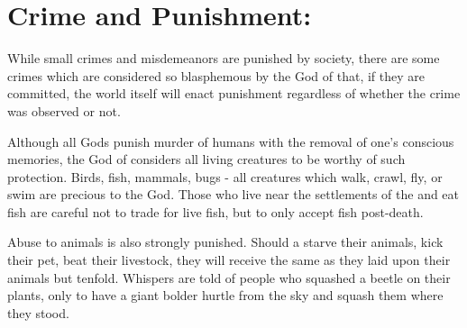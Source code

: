 \documentclass[blue]{GL2020}
\begin{document}
\section*{Crime and Punishment:}

While small crimes and misdemeanors are punished by society, there are some crimes which are considered so blasphemous by the God of \pFarm{} that, if they are committed, the world itself will enact punishment regardless of whether the crime was observed or not.

Although all Gods punish murder of humans with the removal of one's conscious memories, the God of \pFarm{} considers all living creatures to be worthy of such protection.  Birds, fish, mammals, bugs - all creatures which walk, crawl, fly, or swim are precious to the God.  Those \pFarm{} who live near the settlements of the \pShip{} and eat fish are careful not to trade for live fish, but to only accept fish post-death.

Abuse to animals is also strongly punished.  Should a \pFarmer{} starve their animals, kick their pet, beat their livestock, they will receive the same as they laid upon their animals but tenfold.  Whispers are told of people who squashed a beetle on their plants, only to have a giant bolder hurtle from the sky and squash them where they stood.  %
\end{document}
